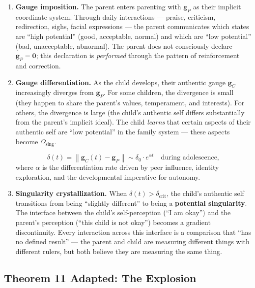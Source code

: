 \documentclass[11pt,a4paper]{article}
\newcommand{\norm}[1]{\left\lVert#1\right\rVert}
\begin{document}
\begin{enumerate}[label=\textbf{Stage \arabic*}, leftmargin=*]

    \item \textbf{Gauge imposition.} The parent enters parenting with $\mathbf{g}_P$ as their implicit coordinate system. Through daily interactions — praise, criticism, redirection, sighs, facial expressions — the parent communicates which states are ``high potential'' (good, acceptable, normal) and which are ``low potential'' (bad, unacceptable, abnormal). The parent does not consciously declare $\mathbf{g}_P = \mathbf{0}$; this declaration is \textit{performed} through the pattern of reinforcement and correction.

    \item \textbf{Gauge differentiation.} As the child develops, their authentic gauge $\mathbf{g}_C$ increasingly diverges from $\mathbf{g}_P$. For some children, the divergence is small (they happen to share the parent's values, temperament, and interests). For others, the divergence is large (the child's authentic self differs substantially from the parent's implicit ideal). The child \textit{learns} that certain aspects of their authentic self are ``low potential'' in the family system — these aspects become $\Omega_{\text{sing}}$.

    \begin{equation}
        \delta(t) = \norm{\mathbf{g}_C(t) - \mathbf{g}_P} \sim \delta_0 \cdot e^{\alpha t} \quad \text{during adolescence},
    \end{equation}
    where $\alpha$ is the differentiation rate driven by peer influence, identity exploration, and the developmental imperative for autonomy.

    \item \textbf{Singularity crystallization.} When $\delta(t) > \delta_{\text{crit}}$, the child's authentic self transitions from being ``slightly different'' to being a \textbf{potential singularity}. The interface between the child's self-perception (``I am okay'') and the parent's perception (``this child is not okay'') becomes a gradient discontinuity. Every interaction across this interface is a comparison that ``has no defined result'' — the parent and child are measuring different things with different rulers, but both believe they are measuring the same thing.

\end{enumerate}

\subsection{Theorem 11 Adapted: The Explosion}
\end{document}
